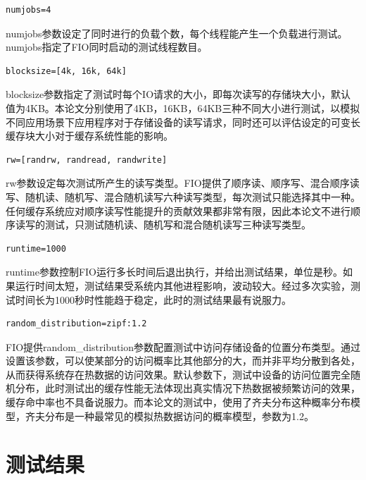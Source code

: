 \begin{lstlisting}
numjobs=4
\end{lstlisting}

numjobs参数设定了同时进行的负载个数，每个线程能产生一个负载进行测试。numjobs指定了FIO同时启动的测试线程数目。

\begin{lstlisting}
blocksize=[4k, 16k, 64k]
\end{lstlisting}

blocksize参数指定了测试时每个IO请求的大小，即每次读写的存储块大小，默认值为4KB。本论文分别使用了4KB，16KB，64KB三种不同大小进行测试，以模拟不同应用场景下应用程序对于存储设备的读写请求，同时还可以评估设定的可变长缓存块大小对于缓存系统性能的影响。

\begin{lstlisting}
rw=[randrw, randread, randwrite]
\end{lstlisting}

rw参数设定每次测试所产生的读写类型。FIO提供了顺序读、顺序写、混合顺序读写、随机读、随机写、混合随机读写六种读写类型，每次测试只能选择其中一种。任何缓存系统应对顺序读写性能提升的贡献效果都非常有限，因此本论文不进行顺序读写的测试，只测试随机读、随机写和混合随机读写三种读写类型。

\begin{lstlisting}
runtime=1000
\end{lstlisting}

runtime参数控制FIO运行多长时间后退出执行，并给出测试结果，单位是秒。如果运行时间太短，测试结果受系统内其他进程影响，波动较大。经过多次实验，测试时间长为1000秒时性能趋于稳定，此时的测试结果最有说服力。

\begin{lstlisting}
random_distribution=zipf:1.2
\end{lstlisting}

FIO提供random\_distribution参数配置测试中访问存储设备的位置分布类型。通过设置该参数，可以使某部分的访问概率比其他部分的大，而并非平均分散到各处，从而获得系统存在热数据的访问效果。默认参数下，测试中设备的访问位置完全随机分布，此时测试出的缓存性能无法体现出真实情况下热数据被频繁访问的效果，缓存命中率也不具备说服力。而本论文的测试中，使用了齐夫分布这种概率分布模型，齐夫分布是一种最常见的模拟热数据访问的概率模型，参数为1.2。

\section{测试结果}
\label{sec:exp_results}

